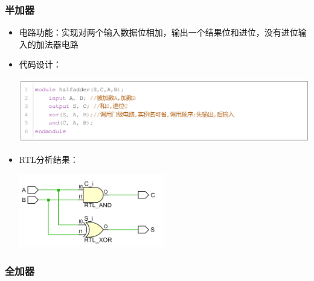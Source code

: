 \documentclass[a4,10pt,zihao=-4]{ctexart}
\begin{document}
\subsubsection{半加器}
\begin{itemize}
\item
  电路功能：实现对两个输入数据位相加，输出一个结果位和进位，没有进位输入的加法器电路
\item

  代码设计：
  
  \includegraphics[width=1\textwidth]{halfadder_Code.png}
\item

  RTL分析结果：
  
  \includegraphics[width=0.5\textwidth]{halfadder_RTL.png}


\end{itemize}
\subsubsection{全加器}
\end{document}
